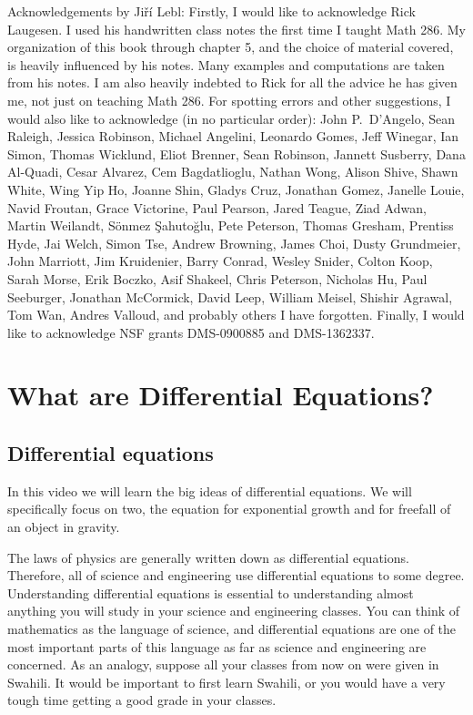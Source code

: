 Acknowledgements by Ji\v{r}\'i Lebl: Firstly, I would like to acknowledge Rick Laugesen.  I used his handwritten
class notes
the first time I taught
Math 286.  My organization of this book through chapter 5,
and the choice of
material covered, is heavily influenced by his notes.  Many
examples and computations are taken from his notes.  I am also heavily
indebted to Rick for all the advice he has given me, not just on teaching
Math 286.
For spotting errors and other suggestions,
I would also like to acknowledge (in no particular order):
John P.\ D'Angelo,
Sean Raleigh, Jessica Robinson, Michael Angelini, Leonardo Gomes, Jeff
Winegar, Ian Simon, Thomas Wicklund, Eliot Brenner, Sean Robinson,
Jannett Susberry, Dana Al-Quadi, Cesar Alvarez, Cem Bagdatlioglu,
Nathan Wong, Alison Shive, Shawn White, Wing Yip Ho, Joanne Shin,
Gladys Cruz, Jonathan Gomez, Janelle Louie, Navid Froutan,
Grace Victorine, Paul Pearson, Jared Teague, Ziad Adwan,
Martin Weilandt, S\"{o}nmez \c{S}ahuto\u{g}lu,
Pete Peterson, Thomas Gresham, Prentiss Hyde, Jai Welch,
Simon Tse, Andrew Browning, James Choi, Dusty Grundmeier,
John Marriott,
Jim Kruidenier,
Barry Conrad,
Wesley Snider,
Colton Koop,
Sarah Morse,
Erik Boczko,
Asif Shakeel,
Chris Peterson,
Nicholas Hu,
Paul Seeburger,
Jonathan McCormick,
David Leep,
William Meisel,
Shishir Agrawal,
Tom Wan,
Andres Valloud,
and probably others I
have forgotten.
Finally, I would like
to acknowledge NSF grants DMS-0900885 and DMS-1362337.



\sectionnewpage
\section{What are Differential Equations?}
\label{introde:section}


\subsection{Differential equations}

\begin{video}
    In this video we will learn the big ideas of differential equations. We will specifically focus on two, the equation for exponential growth and for freefall of an object in gravity.   
\end{video}

The laws of physics are generally written down as differential
equations.  Therefore, all of science and engineering use
differential equations to some degree.  Understanding
differential equations is essential to understanding almost anything you will
study in your science and engineering classes.
You can think of mathematics as the language of science, and
differential equations are one of the most important parts of this
language as far as science and engineering are concerned.  As an analogy,
suppose all your classes from now on were given in Swahili.  
It would be important to first learn Swahili, or you would have a very
tough time getting a good grade in your classes.



